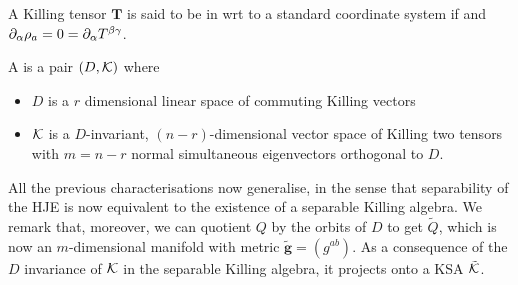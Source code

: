 \documentclass{article}
\begin{document}
\begin{definition}
A Killing tensor $\bm{T}$ is said to be in  wrt to a standard coordinate system if  
and $\partial_\alpha \rho_a = 0 = \partial_\alpha T^{\beta \gamma}$. 
\end{definition}

\begin{definition}
A  is a pair $(D,\mathcal{K})$ where 
\begin{itemize}
    \item $D$ is a $r$ dimensional linear space of commuting Killing vectors 
    \item $\mathcal{K}$ is a $D$-invariant, $(n-r)$-dimensional vector space of Killing two tensors with $m=n-r$ normal simultaneous eigenvectors orthogonal to $D$. 
\end{itemize}
\end{definition}

All the previous characterisations now generalise, in the sense that separability of the HJE is now equivalent to the existence of a separable Killing algebra. We remark that, moreover, we can quotient $Q$ by the orbits of $D$ to get $\tilde{Q}$, which is now an $m$-dimensional manifold with metric $\tilde{\bm{g}} = (g^{ab})$. As a consequence of the $D$ invariance of $\mathcal{K}$ in the separable Killing algebra, it projects onto a KSA $\tilde{\mathcal{K}}$. 



\end{document}
